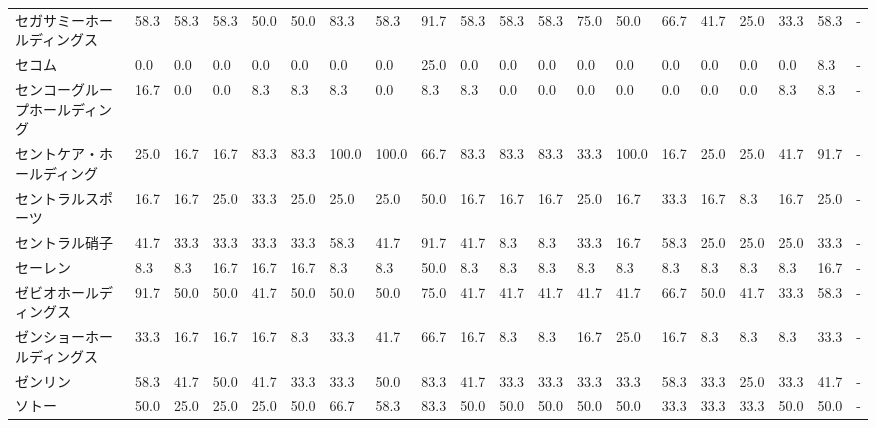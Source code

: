 \begin{tabular}{llllllllllllllllllll}
セガサミーホールディングス   &   58.3 &   58.3 &      58.3 &      50.0 &       50.0 &   83.3 &   58.3 &   91.7 &    58.3 &    58.3 &   58.3 &  75.0 &   50.0 &    66.7 &    41.7 &  25.0 &  33.3 &  58.3 &     - \\
セコム             &    0.0 &    0.0 &       0.0 &       0.0 &        0.0 &    0.0 &    0.0 &   25.0 &     0.0 &     0.0 &    0.0 &   0.0 &    0.0 &     0.0 &     0.0 &   0.0 &   0.0 &   8.3 &     - \\
センコーグループホールディング &   16.7 &    0.0 &       0.0 &       8.3 &        8.3 &    8.3 &    0.0 &    8.3 &     8.3 &     0.0 &    0.0 &   0.0 &    0.0 &     0.0 &     0.0 &   0.0 &   8.3 &   8.3 &     - \\
セントケア・ホールディング   &   25.0 &   16.7 &      16.7 &      83.3 &       83.3 &  100.0 &  100.0 &   66.7 &    83.3 &    83.3 &   83.3 &  33.3 &  100.0 &    16.7 &    25.0 &  25.0 &  41.7 &  91.7 &     - \\
セントラルスポーツ       &   16.7 &   16.7 &      25.0 &      33.3 &       25.0 &   25.0 &   25.0 &   50.0 &    16.7 &    16.7 &   16.7 &  25.0 &   16.7 &    33.3 &    16.7 &   8.3 &  16.7 &  25.0 &     - \\
セントラル硝子         &   41.7 &   33.3 &      33.3 &      33.3 &       33.3 &   58.3 &   41.7 &   91.7 &    41.7 &     8.3 &    8.3 &  33.3 &   16.7 &    58.3 &    25.0 &  25.0 &  25.0 &  33.3 &     - \\
セーレン            &    8.3 &    8.3 &      16.7 &      16.7 &       16.7 &    8.3 &    8.3 &   50.0 &     8.3 &     8.3 &    8.3 &   8.3 &    8.3 &     8.3 &     8.3 &   8.3 &   8.3 &  16.7 &     - \\
ゼビオホールディングス     &   91.7 &   50.0 &      50.0 &      41.7 &       50.0 &   50.0 &   50.0 &   75.0 &    41.7 &    41.7 &   41.7 &  41.7 &   41.7 &    66.7 &    50.0 &  41.7 &  33.3 &  58.3 &     - \\
ゼンショーホールディングス   &   33.3 &   16.7 &      16.7 &      16.7 &        8.3 &   33.3 &   41.7 &   66.7 &    16.7 &     8.3 &    8.3 &  16.7 &   25.0 &    16.7 &     8.3 &   8.3 &   8.3 &  33.3 &     - \\
ゼンリン            &   58.3 &   41.7 &      50.0 &      41.7 &       33.3 &   33.3 &   50.0 &   83.3 &    41.7 &    33.3 &   33.3 &  33.3 &   33.3 &    58.3 &    33.3 &  25.0 &  33.3 &  41.7 &     - \\
ソトー             &   50.0 &   25.0 &      25.0 &      25.0 &       50.0 &   66.7 &   58.3 &   83.3 &    50.0 &    50.0 &   50.0 &  50.0 &   50.0 &    33.3 &    33.3 &  33.3 &  50.0 &  50.0 &     - \\

\end{tabular}
